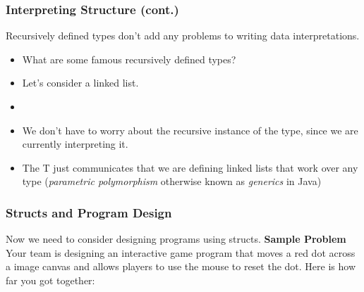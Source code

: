 \documentclass{beamer}
\begin{document}

\begin{frame}
  \frametitle{Interpreting Structure (cont.)}
  Recursively defined types don't add any problems
  to writing data interpretations.
  \begin{itemize}
  \item<2-> What are some famous recursively defined types?
  \item<3-> Let's consider a linked list.
  \item<4-> \LinkedListInterp
  \item<5-> We don't have to worry about the recursive instance of
    the type, since we are currently interpreting it.
  \item<6-> The T just communicates that we are defining linked lists
    that work over any type (\emph{parametric polymorphism} otherwise
    known as \emph{generics} in Java)
  \end{itemize}
\end{frame}


\begin{frame}
  \frametitle{Structs and Program Design}
  Now we need to consider designing programs using structs.
  \textbf{Sample Problem} Your team is designing an interactive game program that moves a red dot across a image canvas and allows players to use the mouse to reset the dot. Here is how far you got together: \pause
  \moveDotStart
\end{frame}



\end{document}
